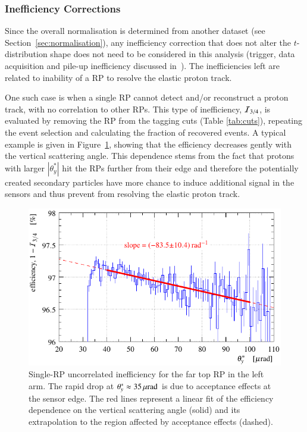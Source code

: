 \subsubsection{Inefficiency Corrections}
\label{sec:ineff corr}

Since the overall normalisation is determined from another dataset (see Section~\ref{sec:normalisation}), any inefficiency correction that does not alter the $t$-distribution shape does not need to be considered in this analysis (trigger, data acquisition and pile-up inefficiency discussed in~\cite{epl101-el,prl111}). The inefficiencies left are related to inability of a RP to resolve the elastic proton track.

One such case is when a single RP cannot detect and/or reconstruct a proton track, with no correlation to other RPs. This type of inefficiency, ${\cal I}_{3/4}$, is evaluated by removing the RP from the tagging cuts (Table \ref{tab:cuts}), repeating the event selection and calculating the fraction of recovered events. A typical example is given in Figure~\ref{fig:eff 3/4}, showing that the efficiency decreases gently with the vertical scattering angle. This dependence stems from the fact that protons with larger $|\theta_y^*|$ hit the RPs further from their edge and therefore the potentially created secondary particles have more chance to induce additional signal in the sensors and thus prevent from resolving the elastic proton track.

\begin{figure}
\begin{center}
\includegraphics{fig/eff3outof4_details_fits.pdf}
\vskip-3mm
\caption{%
Single-RP uncorrelated inefficiency for the far top RP in the left arm. The rapid drop at $\theta_y^* \approx 35\,{\rm \mu rad}$ is due to acceptance effects at the sensor edge. The red lines represent a linear fit of the efficiency dependence on the vertical scattering angle (solid) and its extrapolation to the region affected by acceptance effects (dashed).
}
\label{fig:eff 3/4}
\end{center}
\end{figure}

